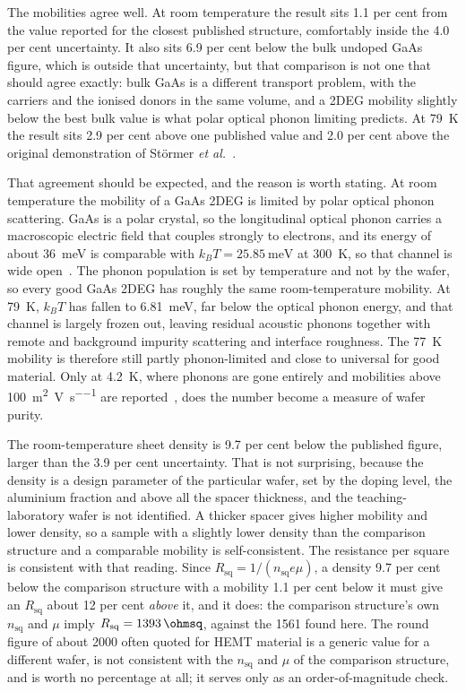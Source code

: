 \documentclass[11pt,a4paper]{article}
\newcommand{\Rsq}{R_{\mathrm{sq}}}
\newcommand{\nsq}{n_{\mathrm{sq}}}
\begin{document}
The mobilities agree well. At room temperature the result sits \num{1.1} per cent from the
value reported for the closest published structure, comfortably inside the \num{4.0} per cent
uncertainty. It also sits \num{6.9} per cent below the bulk undoped GaAs figure, which is
outside that uncertainty, but that comparison is not one that should agree exactly: bulk GaAs
is a different transport problem, with the carriers and the ionised donors in the same volume,
and a 2DEG mobility slightly below the best bulk value is what polar optical phonon limiting
predicts. At \qty{79}{\kelvin} the result sits \num{2.9} per cent above one published value
and \num{2.0} per cent above the original demonstration of St\"ormer
\textit{et al.}~\cite{stormer1979}.

That agreement should be expected, and the reason is worth stating. At room temperature the
mobility of a GaAs 2DEG is limited by polar optical phonon scattering. GaAs is a polar
crystal, so the longitudinal optical phonon carries a macroscopic electric field that couples
strongly to electrons, and its energy of about \qty{36}{\milli\electronvolt} is comparable
with $k_BT = \qty{25.85}{\milli\electronvolt}$ at \qty{300}{\kelvin}, so that channel is wide
open~\cite{walukiewicz1984}. The phonon population is set by temperature and not by the wafer,
so every good GaAs 2DEG has roughly the same room-temperature mobility. At \qty{79}{\kelvin},
$k_BT$ has fallen to \qty{6.81}{\milli\electronvolt}, far below the optical phonon energy, and
that channel is largely frozen out, leaving residual acoustic phonons together with remote and
background impurity scattering and interface roughness. The \qty{77}{\kelvin} mobility is
therefore still partly phonon-limited and close to universal for good material. Only at
\qty{4.2}{\kelvin}, where phonons are gone entirely and mobilities above
\qty{100}{\metre\squared\per\volt\per\second} are reported~\cite{script}, does the number
become a measure of wafer purity.

The room-temperature sheet density is \num{9.7} per cent below the published figure, larger
than the \num{3.9} per cent uncertainty. That is not surprising, because the density is a
design parameter of the particular wafer, set by the doping level, the aluminium fraction and
above all the spacer thickness, and the teaching-laboratory wafer is not identified. A thicker
spacer gives higher mobility and lower density, so a sample with a slightly lower density than
the comparison structure and a comparable mobility is self-consistent. The resistance per
square is consistent with that reading. Since $\Rsq = 1/(\nsq e \mu)$, a density
\num{9.7} per cent below the comparison structure with a mobility \num{1.1} per cent below it
must give an $\Rsq$ about \num{12} per cent \emph{above} it, and it does: the comparison
structure's own $\nsq$ and $\mu$ imply $\Rsq = \qty{1393}{\ohmsq}$, against the
\qty{1561}{\ohmsq} found here. The round figure of about \qty{2000}{\ohmsq} often quoted for
HEMT material is a generic value for a different wafer, is not consistent with the $\nsq$ and
$\mu$ of the comparison structure, and is worth no percentage at all; it serves only as an
order-of-magnitude check.
\end{document}
